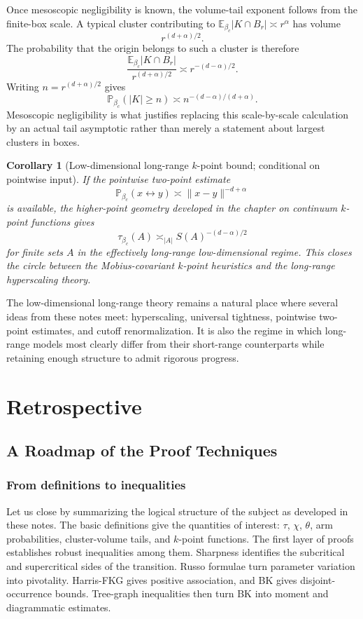 \documentclass[11pt,reqno]{book}
\numberwithin{equation}{chapter}
\theoremstyle{plain}
\newtheorem{corollary}[theorem]{Corollary}
\theoremstyle{definition}
\theoremstyle{remark}
\renewcommand{\P}{\mathbb P}
\newcommand{\E}{\mathbb E}
\newcommand{\1}{\mathbf 1}
\newcommand{\norm}[1]{\lVert #1\rVert}
\begin{document}
Once mesoscopic negligibility is known, the volume-tail exponent follows
from the finite-box scale. A typical cluster contributing to
\(\E_{\beta_c}|K\cap B_r|\asymp r^\alpha\) has volume
\[
  r^{(d+\alpha)/2}.
\]
The probability that the origin belongs to such a cluster is therefore
\[
  \frac{\E_{\beta_c}|K\cap B_r|}
       {r^{(d+\alpha)/2}}
  \asymp
  r^{-(d-\alpha)/2}.
\]
Writing \(n=r^{(d+\alpha)/2}\) gives
\[
  \P_{\beta_c}(|K|\geq n)
  \asymp
  n^{-(d-\alpha)/(d+\alpha)}.
\]
Mesoscopic negligibility is what justifies replacing this scale-by-scale
calculation by an actual tail asymptotic rather than merely a statement about
largest clusters in boxes.

\begin{corollary}[Low-dimensional long-range \(k\)-point bound; conditional on pointwise input]
If the pointwise two-point estimate
\[
  \mathbb P_{\beta_c}(x\leftrightarrow y)\asymp \norm{x-y}^{-d+\alpha}
\]
is available, the higher-point geometry developed in the chapter on continuum \(k\)-point functions gives
\[
  \tau_{\beta_c}(A)\asymp_{|A|} S(A)^{-(d-\alpha)/2}
\]
for finite sets $A$ in the effectively long-range low-dimensional regime. This closes the circle between the Mobius-covariant $k$-point heuristics and the long-range hyperscaling theory.
\end{corollary}

The low-dimensional long-range theory remains a natural place where several ideas from these notes meet: hyperscaling, universal tightness, pointwise two-point estimates, and cutoff renormalization. It is also the regime in which long-range models most clearly differ from their short-range counterparts while retaining enough structure to admit rigorous progress.

\part{Retrospective}

\chapter{A Roadmap of the Proof Techniques}

\section{From definitions to inequalities}

Let us close by summarizing the logical structure of the subject as developed in these notes. The basic definitions give the quantities of interest: $\tau$, $\chi$, $\theta$, arm probabilities, cluster-volume tails, and $k$-point functions. The first layer of proofs establishes robust inequalities among them. Sharpness identifies the subcritical and supercritical sides of the transition. Russo formulae turn parameter variation into pivotality. Harris-FKG gives positive association, and BK gives disjoint-occurrence bounds. Tree-graph inequalities then turn BK into moment and diagrammatic estimates.
\end{document}
